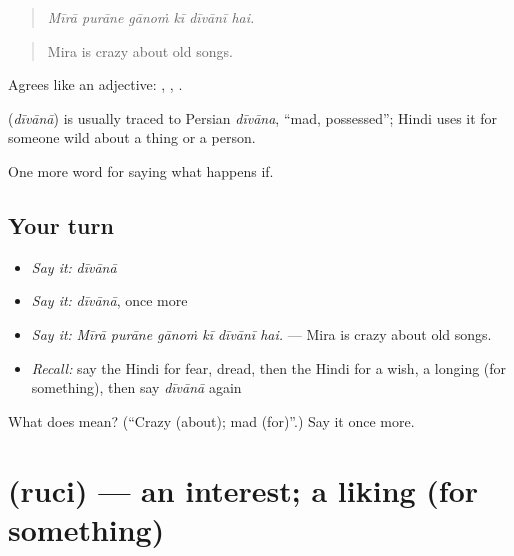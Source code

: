 \begin{quote}
     
\end{quote}

\begin{quote}
\emph{Mīrā purāne gānoṁ kī dīvānī hai.}
\end{quote}

\begin{quote}
Mira is crazy about old songs.
\end{quote}

Agrees like an adjective: , , .

\begin{cousinweb}
\textbf{} (\emph{dīvānā}) is usually traced to Persian \emph{dīvāna}, \textquotedblleft{}mad, possessed\textquotedblright{}; Hindi uses it for someone wild about a thing or a person.
\end{cousinweb}

\begin{grammarlens}[title={What you've built}]
One more word for saying what happens if.
\end{grammarlens}

\subsection*{Your turn}
\begin{itemize}
\raggedright
  \item \emph{Say it:} \emph{dīvānā}
  \item \emph{Say it:} \emph{dīvānā}, once more
  \item \emph{Say it:} \emph{Mīrā purāne gānoṁ kī dīvānī hai.} — Mira is crazy about old songs.
  \item \emph{Recall:} say the Hindi for fear, dread, then the Hindi for a wish, a longing (for something), then say \emph{dīvānā} again
\end{itemize}

\begin{tcolorbox}[breakable,colback=teal!4,colframe=teal!35!black,title={Before you move on}]
What does  mean? (\textquotedblleft{}Crazy (about); mad (for)\textquotedblright{}.) Say it once more.
\end{tcolorbox}
\section[\texorpdfstring{\hi{रुचि} (ruci)}{रुचि (ruci)}]{ (ruci) — an interest; a liking (for something)}

